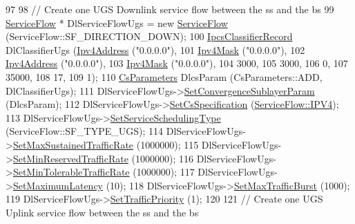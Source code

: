 \begin{DoxyCode}
97 
98   \textcolor{comment}{// Create one UGS Downlink service flow between the ss and the bs}
99   \hyperlink{classns3_1_1ServiceFlow}{ServiceFlow} * DlServiceFlowUgs = \textcolor{keyword}{new} \hyperlink{classns3_1_1ServiceFlow}{ServiceFlow} (ServiceFlow::SF\_DIRECTION\_DOWN);
100   \hyperlink{classns3_1_1IpcsClassifierRecord}{IpcsClassifierRecord} DlClassifierUgs (\hyperlink{classns3_1_1Ipv4Address}{Ipv4Address} (\textcolor{stringliteral}{"0.0.0.0"}),
101                                         \hyperlink{classns3_1_1Ipv4Mask}{Ipv4Mask} (\textcolor{stringliteral}{"0.0.0.0"}),
102                                         \hyperlink{classns3_1_1Ipv4Address}{Ipv4Address} (\textcolor{stringliteral}{"0.0.0.0"}),
103                                         \hyperlink{classns3_1_1Ipv4Mask}{Ipv4Mask} (\textcolor{stringliteral}{"0.0.0.0"}),
104                                         3000,
105                                         3000,
106                                         0,
107                                         35000,
108                                         17,
109                                         1);
110   \hyperlink{classns3_1_1CsParameters}{CsParameters} DlcsParam (CsParameters::ADD, DlClassifierUgs);
111   DlServiceFlowUgs->\hyperlink{classns3_1_1ServiceFlow_a81a801e05aac9e7d1cfad3304e1b9d97}{SetConvergenceSublayerParam} (DlcsParam);
112   DlServiceFlowUgs->\hyperlink{classns3_1_1ServiceFlow_a72779cfbd71284ba06f10843ec0725b9}{SetCsSpecification} (\hyperlink{namespacens3_a79988e6e8b09f64c6ffca894994cb033af56451cc069a62c29e3d7577328b5027}{ServiceFlow::IPV4});
113   DlServiceFlowUgs->\hyperlink{classns3_1_1ServiceFlow_acdef049af2eda0d1ac80047208ce7571}{SetServiceSchedulingType} (ServiceFlow::SF\_TYPE\_UGS);
114   DlServiceFlowUgs->\hyperlink{classns3_1_1ServiceFlow_aef578837096b1a316696a88ecd550e7c}{SetMaxSustainedTrafficRate} (1000000);
115   DlServiceFlowUgs->\hyperlink{classns3_1_1ServiceFlow_ad49e9a793508d2d476de1e08897ecbf6}{SetMinReservedTrafficRate} (1000000);
116   DlServiceFlowUgs->\hyperlink{classns3_1_1ServiceFlow_aafc2368b8dab5d394635fa9f7fe281af}{SetMinTolerableTrafficRate} (1000000);
117   DlServiceFlowUgs->\hyperlink{classns3_1_1ServiceFlow_a61781dc767b833dfc34ed86e9efbc62d}{SetMaximumLatency} (10);
118   DlServiceFlowUgs->\hyperlink{classns3_1_1ServiceFlow_a586065681c386771f441a51f469fab03}{SetMaxTrafficBurst} (1000);
119   DlServiceFlowUgs->\hyperlink{classns3_1_1ServiceFlow_a9fd37b11439e3b6ca601c76e54d6273c}{SetTrafficPriority} (1);
120 
121   \textcolor{comment}{// Create one UGS Uplink service flow between the ss and the bs}

\end{DoxyCode}
